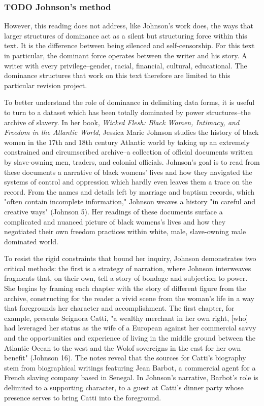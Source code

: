 \documentclass[11pt]{article}
\begin{document}
\subsubsection{{\bfseries\sffamily TODO} Johnson's method}
\label{sec:orgd2d12c3}

However, this reading does not address, like Johnson's work does, the
ways that larger structures of dominance act as a silent but
structuring force within this text. It is the difference between being
silenced and self-censorship. For this text in particular, the
dominant force operates between the writer and his story. A writer
with every privilege--gender, racial, financial, cultural,
educational. The dominance structures that work on this text therefore
are limited to this particular revision project.

To better understand the role of dominance in delimiting data forms,
it is useful to turn to a dataset which has been totally dominated by
power structures--the archive of slavery. In her book, \emph{Wicked Flesh:
Black Women, Intimacy, and Freedom in the Atlantic World}, Jessica
Marie Johnson studies the history of black women in the 17th and 18th
century Atlantic world by taking up an extremely constrained and
circumscribed archive--a collection of official documents written by
slave-owning men, traders, and colonial officials. Johnson's goal is
to read from these documents a narrative of black womens' lives and
how they navigated the systems of control and oppression which hardly
even leaves them a trace on the record. From the names and details
left by marriage and baptism records, which "often contain incomplete
information," Johnson weaves a history "in careful and creative ways"
(Johnson 5). Her readings of these documents surface a complicated and
nuanced picture of black womens's lives and how they negotiated their
own freedom practices within white, male, slave-owning male dominated
world. 

To resist the rigid constraints that bound her inquiry, Johnson
demonstrates two critical methods: the first is a strategy of
narration, where Johnson interweaves fragments that, on their own,
tell a story of bondage and subjection to power. She begins by framing
each chapter with the story of different figure from the archive,
constructing for the reader a vivid scene from the woman's life in a
way that foregrounds her character and accomplishment. The first
chapter, for example, presents Seignora Catti, "a wealthy merchant in
her own right, [who] had leveraged her status as the wife of a
European against her commercial savvy and the opportunities and
experience of living in the middle ground between the Atlantic Ocean
to the west and the Wolof sovereigns in the east for her own benefit"
(Johnson 16). The notes reveal that the sources for Catti's biography
stem from biographical writings featuring Jean Barbot, a commercial
agent for a French slaving company based in Senegal. In Johnson's
narrative, Barbot's role is delimited to a supporting character, to a
guest at Catti's dinner party whose presence serves to bring Catti
into the foreground.
\end{document}
